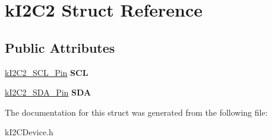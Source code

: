\hypertarget{structkI2C2}{}\section{k\+I2\+C2 Struct Reference}
\label{structkI2C2}
\subsection*{Public Attributes}
\begin{DoxyCompactItemize}
\item 
\hyperlink{structkI2C2__SCL__Pin}{k\+I2\+C2\+\_\+\+S\+C\+L\+\_\+\+Pin} {\bfseries S\+CL}\hypertarget{structkI2C2_af8670468793d611e1598e4b3978fc8ce}{}\label{structkI2C2_af8670468793d611e1598e4b3978fc8ce}

\item 
\hyperlink{structkI2C2__SDA__Pin}{k\+I2\+C2\+\_\+\+S\+D\+A\+\_\+\+Pin} {\bfseries S\+DA}\hypertarget{structkI2C2_a6fe2ef204657e0d784c8b4b4fe472ce6}{}\label{structkI2C2_a6fe2ef204657e0d784c8b4b4fe472ce6}

\end{DoxyCompactItemize}


The documentation for this struct was generated from the following file\+:\begin{DoxyCompactItemize}
\item 
k\+I2\+C\+Device.\+h\end{DoxyCompactItemize}
